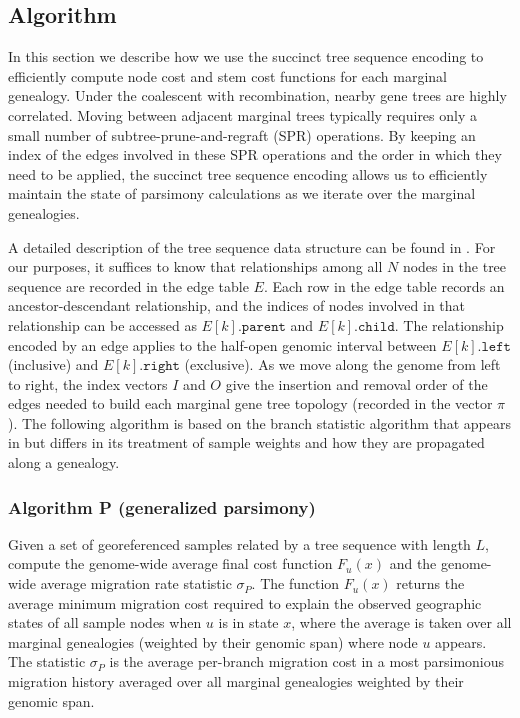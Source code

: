 
\subsection{Algorithm}

In this section we describe how we use the succinct tree sequence encoding
\citep{Kelleher_etal_2016} to efficiently compute node cost and stem cost 
functions for each marginal genealogy. Under the coalescent with recombination, 
nearby gene trees are highly correlated. Moving between adjacent marginal trees 
typically requires only a small number of subtree-prune-and-regraft (SPR) 
operations. By keeping an index of the edges involved in these SPR operations 
and the order in which they need to be applied, the succinct tree sequence 
encoding allows us to efficiently maintain the state of parsimony calculations 
as we iterate over the marginal genealogies.

A detailed description of the tree sequence data structure can be found in
\citet{Kelleher_etal_2016}. For our purposes, it suffices to know that
relationships among all $N$ nodes in the tree sequence are recorded in the edge 
table $E$. Each row in the edge table records an ancestor-descendant
relationship, and the indices of nodes involved in that relationship can be 
accessed as $E[k].\texttt{parent}$ and  $E[k].\texttt{child}$. The relationship 
encoded by an edge applies to the half-open genomic interval between $E[k].\texttt{left}$ 
(inclusive) and $E[k].\texttt{right}$ (exclusive). As we move along the genome 
from left to right, the index vectors $I$ and $O$ give the insertion and
removal order of the edges needed to build each marginal gene tree topology 
(recorded in the vector $\pi$). The following algorithm is based on
the branch statistic algorithm that appears in \citet{Ralph_etal_2020} but
differs in its treatment of sample weights and how they are propagated along
a genealogy.

\subsubsection*{Algorithm P (generalized parsimony)}

Given a set of georeferenced samples related by a tree sequence with length
$L$, compute the genome-wide average final cost function $F_u(x)$ and the
genome-wide average migration rate statistic $\sigma_P$. The function $F_u(x)$ 
returns the average minimum migration cost required to explain the observed 
geographic states of all sample nodes when $u$ is in state $x$, where the 
average is taken over all marginal genealogies (weighted by their genomic span)
where node $u$ appears. The statistic $\sigma_P$ is the average per-branch 
migration cost in a most parsimonious migration history averaged over all
marginal genealogies weighted by their genomic span.

